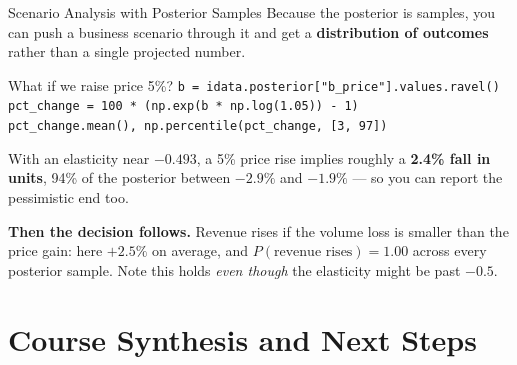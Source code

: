 \documentclass[aspectratio=169, 11pt]{beamer}
\begin{document}
\begin{frame}{Scenario Analysis with Posterior Samples}
  Because the posterior is samples, you can push a business scenario through it and get a
  \textbf{distribution of outcomes} rather than a single projected number.

  \begin{examplebox}{What if we raise price 5\%?}
    {\scriptsize\linespread{1.05}\selectfont
    \texttt{b = idata.posterior["b\_price"].values.ravel()}\\
    \texttt{pct\_change = 100 * (np.exp(b * np.log(1.05)) - 1)}\\[2pt]
    \texttt{pct\_change.mean(), np.percentile(pct\_change, [3, 97])}
    }
  \end{examplebox}

  With an elasticity near $-0.493$, a 5\% price rise implies roughly a \textbf{2.4\% fall in
  units}, 94\% of the posterior between $-2.9\%$ and $-1.9\%$ --- so you can report the
  pessimistic end too.

  \vspace{0.1cm}
  \textbf{Then the decision follows.} Revenue rises if the volume loss is smaller than the price
  gain: here $+2.5\%$ on average, and $P(\text{revenue rises}) = 1.00$ across every posterior
  sample. Note this holds \emph{even though} the elasticity might be past $-0.5$.

\end{frame}

\section{Course Synthesis and Next Steps}

\end{document}
